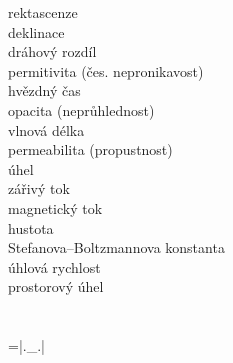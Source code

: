  rektascenze\\
 deklinace\\
 dráhový rozdíl\\
 permitivita (čes. nepronikavost)\\
 hvězdný čas\\
 opacita (neprůhlednost)\\
 vlnová délka\\
 permeabilita (propustnost)\\
 úhel\\
 zářivý tok\\
 magnetický tok\\
 hustota\\
 Stefanova--Boltzmannova konstanta\\
 úhlová rychlost\\
 prostorový úhel\\

\s{}{} \\



\s{}{} \\

=\hbox{\verbtt|._.|} \\





